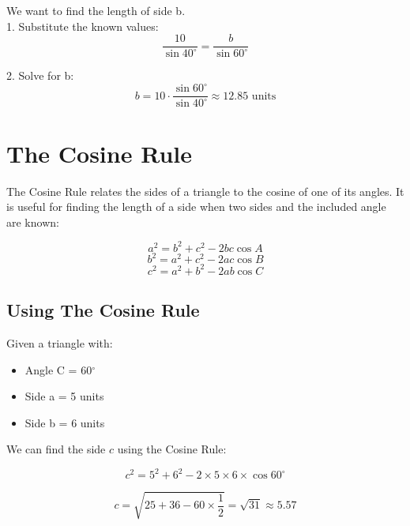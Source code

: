 \documentclass[12pt]{article}
\begin{document}
We want to find the length of side b.\\

1. Substitute the known values:\\

$$\frac{10}{\sin{40^\circ}} = \frac{b}{\sin{60^\circ}}$$


2. Solve for b:\\

$$b = 10 \cdot \frac{\sin{60^\circ}}{\sin{40^\circ}}
\approx 12.85 \text{ units}$$

\newpage

\section*{The Cosine Rule}
The Cosine Rule relates the sides of a triangle to the cosine of one of its angles. It is useful for finding the length of a side when two sides and the included angle are known:

\[a^2 = b^2 + c^2 - 2bc \cos A\]
\[b^2 = a^2 + c^2 - 2ac \cos B\]
\[c^2 = a^2 + b^2 - 2ab \cos C \]

\vfill

\subsection*{Using The Cosine Rule}

Given a triangle with:
\begin{itemize}
\item Angle C = 60$^\circ$
\item Side a = 5 units
\item Side b = 6 units
\end{itemize}

\begin{center}
\end{center}

We can find the side \(c\) using the Cosine Rule:

$$c^2 = 5^2 + 6^2 - 2 \times 5 \times 6 \times \cos 60^\circ$$

$$c = \sqrt{25 + 36 - 60 \times \frac{1}{2}} = \sqrt{31} \approx 5.57$$
\end{document}

